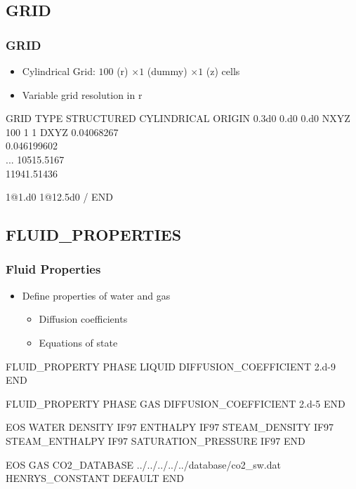 \documentclass{beamer}
\begin{document}
\subsection{GRID}
\begin{frame}\frametitle{GRID}

\begin{itemize}
  \item Cylindrical Grid: $100$ (r) $\times 1 $ (dummy) $\times 1$ (z) cells
  \item Variable grid resolution in r
\end{itemize}

\begin{semiverbatim}
GRID
  TYPE STRUCTURED CYLINDRICAL
  ORIGIN 0.3d0 0.d0 0.d0
  NXYZ 100 1 1
  DXYZ
    0.04068267 \\
    0.046199602 \\
    ...
    10515.5167 \\
    11941.51436

    1@1.d0
    1@12.5d0
  /
END
\end{semiverbatim}

\end{frame}
\subsection{FLUID\_PROPERTIES}
\begin{frame}\frametitle{Fluid Properties}

\begin{itemize}
  \item Define properties of water and gas
  \begin{itemize}
    \item Diffusion coefficients
    \item Equations of state
  \end{itemize}
\end{itemize}

\begin{semiverbatim}
FLUID_PROPERTY
  PHASE LIQUID
  DIFFUSION_COEFFICIENT 2.d-9
END

FLUID_PROPERTY
  PHASE GAS
  DIFFUSION_COEFFICIENT 2.d-5
END

\newpage

EOS WATER
  DENSITY IF97
  ENTHALPY IF97
  STEAM_DENSITY IF97
  STEAM_ENTHALPY IF97
  SATURATION_PRESSURE IF97
END

EOS GAS
  CO2_DATABASE ../../../../../database/co2_sw.dat
  HENRYS_CONSTANT DEFAULT
END

\end{semiverbatim}

\end{frame}
\end{document}
